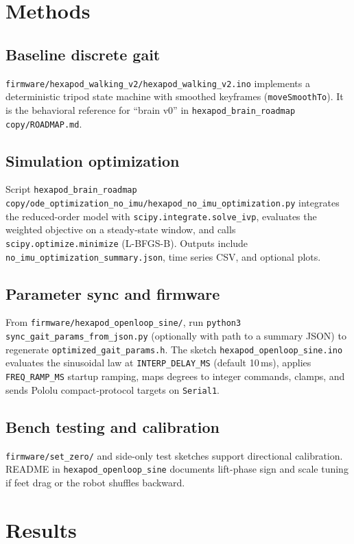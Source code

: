 \documentclass[11pt]{article}
\begin{document}
\section{Methods}

\subsection{Baseline discrete gait}
\texttt{firmware/hexapod\_walking\_v2/hexapod\_walking\_v2.ino} implements a deterministic tripod state machine with smoothed keyframes (\texttt{moveSmoothTo}). It is the behavioral reference for ``brain v0'' in \texttt{hexapod\_brain\_roadmap copy/ROADMAP.md}.

\subsection{Simulation optimization}
Script \texttt{hexapod\_brain\_roadmap copy/ode\_optimization\_no\_imu/hexapod\_no\_imu\_optimization.py} integrates the reduced-order model with \texttt{scipy.integrate.solve\_ivp}, evaluates the weighted objective on a steady-state window, and calls \texttt{scipy.optimize.minimize} (L-BFGS-B). Outputs include \texttt{no\_imu\_optimization\_summary.json}, time series CSV, and optional plots.

\subsection{Parameter sync and firmware}
From \texttt{firmware/hexapod\_openloop\_sine/}, run \texttt{python3 sync\_gait\_params\_from\_json.py} (optionally with path to a summary JSON) to regenerate \texttt{optimized\_gait\_params.h}. The sketch \texttt{hexapod\_openloop\_sine.ino} evaluates the sinusoidal law at \texttt{INTERP\_DELAY\_MS} (default 10\,ms), applies \texttt{FREQ\_RAMP\_MS} startup ramping, maps degrees to integer commands, clamps, and sends Pololu compact-protocol targets on \texttt{Serial1}.

\subsection{Bench testing and calibration}
\texttt{firmware/set\_zero/} and side-only test sketches support directional calibration. README in \texttt{hexapod\_openloop\_sine} documents lift-phase sign and scale tuning if feet drag or the robot shuffles backward.

\section{Results}
\end{document}
